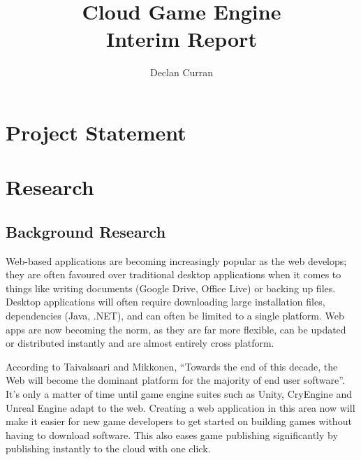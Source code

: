 \documentclass[a4paper, 12pt]{article}
\begin{document}
\title{
	{Cloud Game Engine}\\
	\large{Interim Report}\\
}
\author{Declan Curran}
\maketitle
\newpage

\setcounter{tocdepth}{3}
\tableofcontents
\newpage

\section{Project Statement}
\section{Research}
\subsection{Background Research}

Web-based applications are becoming increasingly popular as the web develops; they are often favoured over traditional desktop applications when it comes to things like writing documents (Google Drive, Office Live) or backing up files.\cite{6068340} Desktop applications will often require downloading large installation files, dependencies (Java, .NET), and can often be limited to a single platform. Web apps are now becoming the norm, as they are far more flexible, can be updated or distributed instantly and are almost entirely cross platform.\cite{5936687}

According to Taivalsaari and Mikkonen, ``Towards the end of this decade, the Web will become the dominant platform for the majority of 
end user software''.\cite{6068340} It's only a matter of time until game engine suites such as Unity\cite{unity}, CryEngine\cite{cryengine} and Unreal Engine\cite{unreal} adapt to the web. Creating a web application in this area now will make it easier for new game developers to get started on building games without having to download software. This also eases game publishing significantly by publishing instantly to the cloud with one click.
\end{document}
